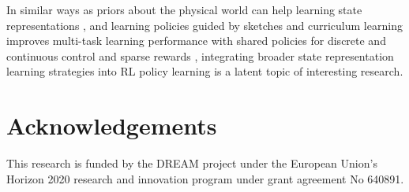 \documentclass[a4paper]{article}
\begin{document}
In similar ways as priors about the physical world can help learning state representations \cite{Jonschkowski15,Lesort17}, and learning policies guided by sketches and curriculum learning improves multi-task learning performance with shared policies for discrete and continuous control and sparse rewards \cite{Andreas17}, integrating broader state representation learning strategies into RL policy learning is a latent topic of interesting research.



\section{Acknowledgements}
This research is funded by the DREAM project under the European Union's Horizon 2020 research and innovation program under grant agreement No 640891.



\end{document}
